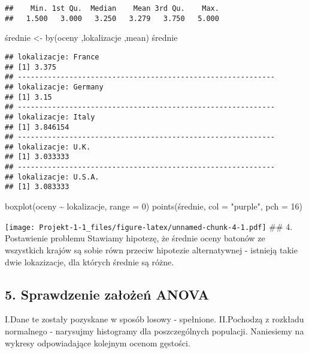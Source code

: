 \documentclass[
]{article}
\newenvironment{Shaded}{\begin{snugshade}}{\end{snugshade}}
\newcommand{\AttributeTok}[1]{\textcolor[rgb]{0.77,0.63,0.00}{#1}}
\newcommand{\DecValTok}[1]{\textcolor[rgb]{0.00,0.00,0.81}{#1}}
\newcommand{\FunctionTok}[1]{\textcolor[rgb]{0.00,0.00,0.00}{#1}}
\newcommand{\NormalTok}[1]{#1}
\newcommand{\OtherTok}[1]{\textcolor[rgb]{0.56,0.35,0.01}{#1}}
\newcommand{\SpecialCharTok}[1]{\textcolor[rgb]{0.00,0.00,0.00}{#1}}
\newcommand{\StringTok}[1]{\textcolor[rgb]{0.31,0.60,0.02}{#1}}
\begin{document}
\begin{verbatim}
##    Min. 1st Qu.  Median    Mean 3rd Qu.    Max. 
##   1.500   3.000   3.250   3.279   3.750   5.000
\end{verbatim}

\begin{Shaded}
\begin{Highlighting}[]
\NormalTok{średnie }\OtherTok{\textless{}{-}} \FunctionTok{by}\NormalTok{(oceny ,lokalizacje ,mean)}
\NormalTok{średnie}
\end{Highlighting}
\end{Shaded}

\begin{verbatim}
## lokalizacje: France
## [1] 3.375
## ------------------------------------------------------------ 
## lokalizacje: Germany
## [1] 3.15
## ------------------------------------------------------------ 
## lokalizacje: Italy
## [1] 3.846154
## ------------------------------------------------------------ 
## lokalizacje: U.K.
## [1] 3.033333
## ------------------------------------------------------------ 
## lokalizacje: U.S.A.
## [1] 3.083333
\end{verbatim}

\begin{Shaded}
\begin{Highlighting}[]
\FunctionTok{boxplot}\NormalTok{(oceny }\SpecialCharTok{\textasciitilde{}}\NormalTok{ lokalizacje, }\AttributeTok{range =} \DecValTok{0}\NormalTok{)}
\FunctionTok{points}\NormalTok{(średnie, }\AttributeTok{col =} \StringTok{"purple"}\NormalTok{, }\AttributeTok{pch =} \DecValTok{16}\NormalTok{)}
\end{Highlighting}
\end{Shaded}

\texttt{[image: Projekt-1-1\_files/figure-latex/unnamed-chunk-4-1.pdf]}
\#\# 4. Postawienie problemu Stawiamy hipotezę, że średnie oceny batonów
ze wszystkich krajów są sobie równ przeciw hipotezie alternatywnej -
istnieją takie dwie lokazizacje, dla których średnie są różne.

\hypertarget{sprawdzenie-zaux142oux17ceux144-anova-1}{%
\subsection{5. Sprawdzenie założeń
ANOVA}\label{sprawdzenie-zaux142oux17ceux144-anova-1}}

I.Dane te zostały pozyskane w sposób losowy - spełnione. II.Pochodzą z
rozkładu normalnego - narysujmy histogramy dla poszczególnych populacji.
Naniesiemy na wykresy odpowiadające kolejnym ocenom gęstości.
\end{document}
